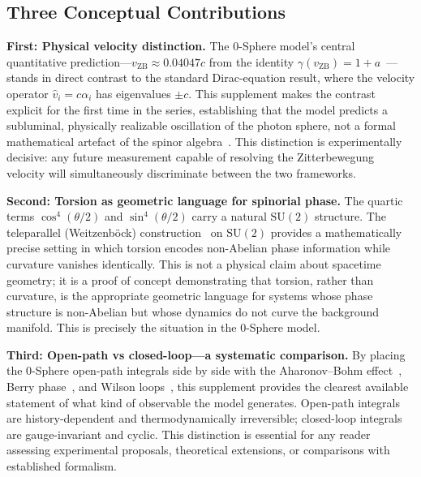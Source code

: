 \documentclass[12pt,letterpaper]{article}
\begin{document}
\subsection{Three Conceptual Contributions}

\textbf{First: Physical velocity distinction.} The 0-Sphere model's central quantitative prediction---$v_{\mathrm{ZB}} \approx 0.04047c$ from the identity $\gamma(v_{\mathrm{ZB}}) = 1 + a$~\cite{hanamura17765409}---stands in direct contrast to the standard Dirac-equation result, where the velocity operator $\hat{v}_i = c\alpha_i$ has eigenvalues $\pm c$. This supplement makes the contrast explicit for the first time in the series, establishing that the model predicts a subluminal, physically realizable oscillation of the photon sphere, not a formal mathematical artefact of the spinor algebra~\cite{hanamura17760132,hanamura18356895}. This distinction is experimentally decisive: any future measurement capable of resolving the Zitterbewegung velocity will simultaneously discriminate between the two frameworks.

\textbf{Second: Torsion as geometric language for spinorial phase.} The quartic terms $\cos^4(\theta/2)$ and $\sin^4(\theta/2)$ carry a natural $\mathrm{SU}(2)$ structure. The teleparallel (Weitzenb\"{o}ck) construction~\cite{Weitzenbock1923,Aldrovandi2013} on $\mathrm{SU}(2)$ provides a mathematically precise setting in which torsion encodes non-Abelian phase information while curvature vanishes identically. This is not a physical claim about spacetime geometry; it is a proof of concept demonstrating that torsion, rather than curvature, is the appropriate geometric language for systems whose phase structure is non-Abelian but whose dynamics do not curve the background manifold. This is precisely the situation in the 0-Sphere model.

\textbf{Third: Open-path vs closed-loop---a systematic comparison.} By placing the 0-Sphere open-path integrals side by side with the Aharonov--Bohm effect~\cite{ABEffect}, Berry phase~\cite{Berry1984}, and Wilson loops~\cite{WilsonLoop}, this supplement provides the clearest available statement of what kind of observable the model generates. Open-path integrals are history-dependent and thermodynamically irreversible; closed-loop integrals are gauge-invariant and cyclic. This distinction is essential for any reader assessing experimental proposals, theoretical extensions, or comparisons with established formalism.
\end{document}
